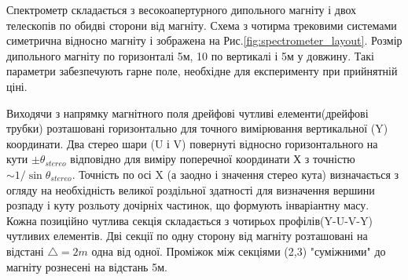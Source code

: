	Спектрометр складається з весокоапертурного дипольного магніту і двох телескопів по обидві сторони від магніту. Схема з чотирма трековими системами симетрична відносно магніту і зображена на Рис.\ref{fig:spectrometer_layout}. Розмір дипольного магніту по горизонталі 5м, 10 по вертикалі і 5м у довжину. Такі параметри забезпечують гарне поле, необхідне для експерименту при прийнятній ціні.
	

	Виходячи з напрямку магнітного поля дрейфові чутливі елементи(дрейфові трубки) розташовані горизонтально для точного вимірювання вертикальної (Y) координати. Два стерео шари (U і V) повернуті відносно горизонтального на кути $ \pm \theta _{stereo}$ відповідно для виміру поперечної координати Х з точністю $ \sim 1/ \sin \theta _{stereo}$. Точність по осі X (а заодно і значення стерео кута) визначається з  огляду на необхідність великої роздільної здатності для визначення  вершини розпаду і куту розльоту дочірніх частинок, що формують інваріантну масу. Кожна позиційно чутлива секція складається з чотирьох профілів(Y-U-V-Y) чутливих елементів. Дві секції по одну сторону від магніту розташовані на відстані $\bigtriangleup = 2 m$ одна від одної. Проміжок між секціями (2,3) "суміжними" до магніту рознесені на відстань 5м.


